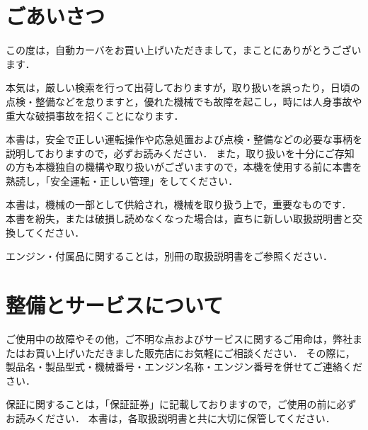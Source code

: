 %
%
\clearpage%

\cleardoublepage %

\setlength{\parindent}{1em}  %
\normalsize %
\restoregeometry %


\part*{ごあいさつ}

この度は，自動カーバをお買い上げいただきまして，まことにありがとうございます．

本気は，厳しい検索を行って出荷しておりますが，取り扱いを誤ったり，日頃の点検・整備などを怠りますと，優れた機械でも故障を起こし，時には人身事故や重大な破損事故を招くことになります．

本書は，安全で正しい運転操作や応急処置および点検・整備などの必要な事柄を説明しておりますので，必ずお読みください．
また，取り扱いを十分にご存知の方も本機独自の機構や取り扱いがございますので，本機を使用する前に本書を熟読し，「安全運転・正しい管理」をしてください．

本書は，機械の一部として供給され，機械を取り扱う上で，重要なものです．
本書を紛失，または破損し読めなくなった場合は，直ちに新しい取扱説明書と交換してください．

エンジン・付属品に関することは，別冊の取扱説明書をご参照ください．




\part*{整備とサービスについて}

ご使用中の故障やその他，ご不明な点およびサービスに関するご用命は，弊社またはお買い上げいただきました販売店にお気軽にご相談ください．
その際に，製品名・製品型式・機械番号・エンジン名称・エンジン番号を併せてご連絡ください．

保証に関することは，「保証証券」に記載しておりますので，ご使用の前に必ずお読みください．
本書は，各取扱説明書と共に大切に保管してください．


\setlength{\parindent}{0pt}
